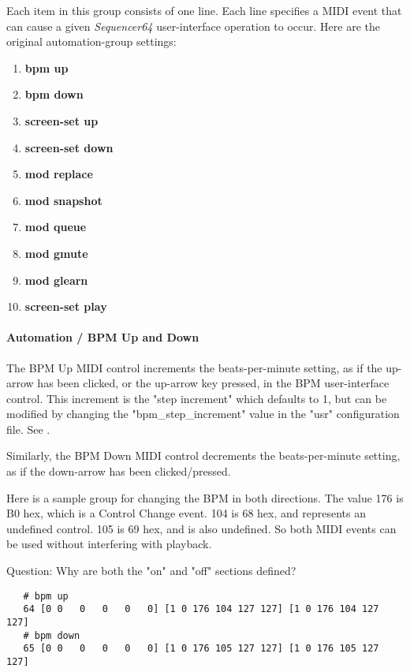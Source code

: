    Each item in this group consists of one line.  Each line
   specifies a MIDI event that can cause a given
   \textsl{Sequencer64} user-interface operation to occur.
   Here are the original automation-group settings:

   \begin{enumerate}
      \item \textbf{bpm up}
      \item \textbf{bpm down}
      \item \textbf{screen-set up}
      \item \textbf{screen-set down}
      \item \textbf{mod replace}
      \item \textbf{mod snapshot}
      \item \textbf{mod queue}
      \item \textbf{mod gmute}
      \item \textbf{mod glearn}
      \item \textbf{screen-set play}
   \end{enumerate}

\paragraph{Automation / BPM Up and Down}
\label{paragraph:seq64_rc_file_midi_ctrl_bpmupdn}

   The BPM Up MIDI control increments the beats-per-minute setting, as if
   the up-arrow has been clicked, or the up-arrow key pressed, in
   the BPM user-interface control.
   This increment is the
   "step increment" which defaults to 1, but can be modified by
   changing the "bpm\_step\_increment" value in the "usr"
   configuration file.
   See .

   Similarly, the BPM Down MIDI control decrements the beats-per-minute
   setting, as if the down-arrow has been clicked/pressed.

   Here is a sample group for changing the BPM in both directions.  The value
   176 is B0 hex, which is a Control Change event.  104 is 68 hex, and
   represents an undefined control.  105 is 69 hex, and is also undefined. So
   both MIDI events can be used without interfering with playback.

   Question: Why are both the "on" and "off" sections defined?

   \begin{verbatim}
   # bpm up
   64 [0 0   0   0   0   0] [1 0 176 104 127 127] [1 0 176 104 127 127]
   # bpm down
   65 [0 0   0   0   0   0] [1 0 176 105 127 127] [1 0 176 105 127 127]
   \end{verbatim}

